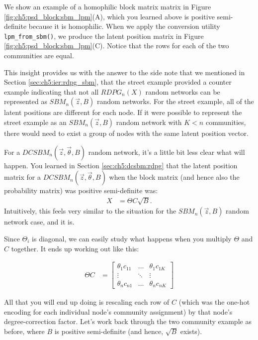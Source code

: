 We show an example of a homophilic block matrix matrix in Figure \ref{fig:ch5:psd_block:sbm_lpm}(A), which you learned above is positive semi-definite because it is homophilic. When we apply the conversion utility \texttt{lpm\_from\_sbm()}, we produce the latent position matrix in Figure \ref{fig:ch5:psd_block:sbm_lpm}(C). Notice that the rows for each of the two communities are equal. 

This insight provides us with the answer to the side note that we mentioned in Section \ref{sec:ch5:ier:rdpg_sbm}, that the street example provided a counter example indicating that not all $RDPG_n(X)$ random networks can be represented as $SBM_n(\vec z, B)$ random networks. For the street example, all of the latent positions are different for each node. If it were possible to represent the street example as an $SBM_n(\vec z, B)$ random network with $K < n$ communities, there would need to exist a group of nodes with the same latent position vector.

For a $DCSBM_n(\vec z, \vec \theta, B)$ random network, it's a little bit less clear what will happen. You learned in Section \ref{sec:ch5:dcsbm:rdpg} that the latent position matrix for a $DCSBM_n(\vec z, \vec \theta, B)$ when the block matrix (and hence also the probability matrix) was positive semi-definite was:
\begin{align*}
    X &= \Theta C \sqrt B.
\end{align*}
Intuitively, this feels very similar to the situation for the $SBM_n(\vec z, B)$ random network case, and it is.

Since $\Theta_i$ is diagonal, we can easily study what happens when you multiply $\Theta$ and $C$ together. It ends up working out like this:

\begin{align*}
    \Theta C &= \begin{bmatrix}
        \theta_1 c_{11} & \hdots & \theta_1 c_{1K} \\
        \vdots & \ddots & \vdots \\
        \theta_n c_{n1} & \hdots & \theta_n c_{nK}
    \end{bmatrix}
\end{align*}

All that you will end up doing is rescaling each row of $C$ (which was the one-hot encoding for each individual node's community assignment) by that node's degree-correction factor. Let's work back through the two community example as before, where $B$ is positive semi-definite (and hence, $\sqrt B$ exists). 

